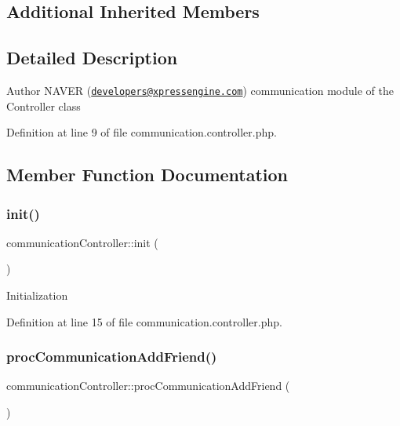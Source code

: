 \subsection*{Additional Inherited Members}


\subsection{Detailed Description}
\begin{DoxyAuthor}{Author}
N\+A\+V\+ER (\href{mailto:developers@xpressengine.com}{\tt developers@xpressengine.\+com}) communication module of the Controller class 
\end{DoxyAuthor}


Definition at line 9 of file communication.\+controller.\+php.



\subsection{Member Function Documentation}
\hypertarget{classcommunicationController_ae0bac4165bbba7f134ef74749c58f0df}{}\label{classcommunicationController_ae0bac4165bbba7f134ef74749c58f0df} 
\subsubsection{\texorpdfstring{init()}{init()}}
{\footnotesize\ttfamily communication\+Controller\+::init (\begin{DoxyParamCaption}{ }\end{DoxyParamCaption})}

Initialization 

Definition at line 15 of file communication.\+controller.\+php.

\hypertarget{classcommunicationController_a0d40e483d00a2b041578ad974fb3a5b5}{}\label{classcommunicationController_a0d40e483d00a2b041578ad974fb3a5b5} 
\subsubsection{\texorpdfstring{proc\+Communication\+Add\+Friend()}{procCommunicationAddFriend()}}
{\footnotesize\ttfamily communication\+Controller\+::proc\+Communication\+Add\+Friend (\begin{DoxyParamCaption}{ }\end{DoxyParamCaption})}

